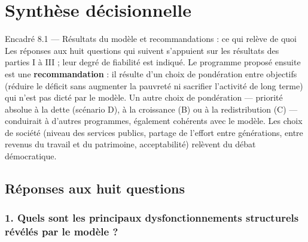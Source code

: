 \chapter{Synthèse décisionnelle}
\label{ch:synthese}

\begin{encadre}{Encadré 8.1 — Résultats du modèle et recommandations : ce qui relève de quoi}
Les réponses aux huit questions qui suivent s'appuient sur les résultats des parties I à III ; leur degré de fiabilité
est indiqué. Le programme proposé ensuite est une \textbf{recommandation} : il résulte d'un choix de pondération entre
objectifs (réduire le déficit sans augmenter la pauvreté ni sacrifier l'activité de long terme) qui n'est pas dicté par
le modèle. Un autre choix de pondération — priorité absolue à la dette (scénario D), à la croissance (B) ou à la
redistribution (C) — conduirait à d'autres programmes, également cohérents avec le modèle. Les choix de société
(niveau des services publics, partage de l'effort entre générations, entre revenus du travail et du patrimoine,
acceptabilité) relèvent du débat démocratique.
\end{encadre}

\section{Réponses aux huit questions}

\subsection*{1. Quels sont les principaux dysfonctionnements structurels révélés par le modèle ?}

